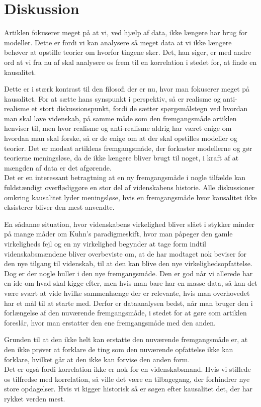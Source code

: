 \section{Diskussion}
Artiklen fokuserer meget på at vi, ved hjælp af data, ikke længere har brug for modeller. Dette er fordi vi kan analysere så meget data at vi ikke længere behøver at opstille teorier om hvorfor tingene sker. Det, han siger, er med andre ord at vi fra nu af skal analysere os frem til en korrelation i stedet for, at finde en kausalitet. 

Dette er i stærk kontrast til den filosofi der er nu, hvor man fokuserer meget på kausalitet. For at sætte hans synspunkt i perspektiv, så er realisme og anti-realisme et stort diskussionspunkt, fordi de sætter spørgsmålstegn ved hvordan man skal lave videnskab, på samme måde som den fremgangsmåde artiklen henviser til, men hvor realisme og anti-realisme aldrig har været enige om hvordan man skal forske, så er de enige om at der skal opstilles modeller og teorier. Det er modsat artiklens fremgangsmåde, der forkaster modellerne og gør teorierne meningsløse, da de ikke længere bliver brugt til noget, i kraft af at mængden af data er det afgørende. \\
Det er en interessant betragtning at en ny fremgangsmåde i nogle tilfælde kan fuldstændigt overflødiggøre en stor del af videnskabens historie. Alle diskussioner omkring kausalitet lyder meningsløse, hvis en fremgangsmåde hvor kausalitet ikke eksisterer bliver den mest anvendte. 

En sådanne situation, hvor videnskabens virkelighed bliver slået i stykker minder på mange måder om Kuhn's paradigmeskift, hvor man påpeger den gamle virkeligheds fejl og en ny virkelighed begynder at tage form indtil videnskabsmændene bliver overbeviste om, at de har modtaget nok beviser for den nye tilgang til videnskab, til at den kan blive den nye virkelighedsopfattelse. \\
Dog er der nogle huller i den nye fremgangsmåde. Den er god når vi allerede har en ide om hvad skal kigge efter, men hvis man bare har en masse data, så kan det være svært at vide hvilke sammenhænge der er relevante, hvis man overhovedet har et mål til at starte med. Derfor er dataanalysen bedst, når man bruger den i forlængelse af den nuværende fremgangsmåde, i stedet for at gøre som artiklen foreslår, hvor man erstatter den ene fremgangsmåde med den anden. 

Grunden til at den ikke helt kan erstatte den nuværende fremgangsmåde er, at den ikke prøver at forklare de ting som den nuværende opfattelse ikke kan forklare, hvilket går at den ikke kan forvise den anden form. \\
Det er også fordi korrelation ikke er nok for en videnskabsmand. Hvis vi stillede os tilfredse med korrelation, så ville det være en tilbagegang, der forhindrer nye store opdagelser. Hvis vi kigger historisk så er søgen efter kausalitet det, der har rykket verden mest. 

